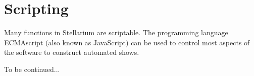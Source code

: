 
\chapter{Scripting}
\label{ch:scripting}

Many functions in Stellarium are scriptable. The programming language
ECMAscript (also known as JavaScript) can be used to control most
aspects of the software to construct automated shows.

To be continued...


